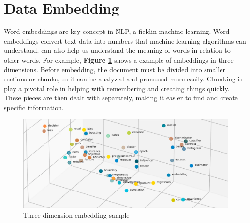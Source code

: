 \section{Data Embedding}
Word embeddings are key concept in NLP, a fieldin machine learning. Word embeddings convert text data into numbers that machine learning algorithms can understand. can also help us understand the meaning of words in relation to other words. For example, \textbf{Figure \ref{fig:embed}} shows a example of embeddings in three dimensions. %
\vskip 0.5cm
Before embedding, the document must be divided into smaller sections or chunks, so it can be analyzed and processed more easily. Chunking is play a pivotal role in helping with remembering and creating things quickly. These pieces are then dealt with separately, making it easier to find and create specific information.

\begin{figure}[H]
    \centering
    \includegraphics[width=1 \linewidth]{assets/3-d embed.png}
    \caption{Three-dimension embedding sample}
    \label{fig:embed}
\end{figure}
